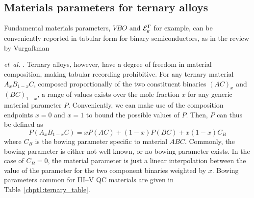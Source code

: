 \documentclass[12pt]{report}
\begin{document}
\subsection{Materials parameters for ternary alloys}

Fundamental materials parameters, $VBO$ and $\EE_g^\Gamma$ for example, can be conveniently reported in tabular form for binary semiconductors, as in the review by Vurgaftman {\emph{et~al.} \cite{Vurgaftman}.  Ternary alloys, however, have a degree of freedom in material composition, making tabular recording prohibitive.  For any ternary material $A_x B_{1-x} C$, composed proportionally of the two constituent binaries $(AC)_x$ and $(BC)_{1-x}$, a range of values exists over the mole fraction $x$ for any generic material parameter $P$.  Conveniently, we can make use of the composition endpoints $x=0$ and $x=1$ to bound the possible values of $P$.  Then, $P$ can thus be defined as
\begin{equation}
P(A_x B_{1-x} C) = x P(AC) + (1-x) P(BC) + x(1-x) C_B
\end{equation}
where $C_B$ is the bowing parameter specific to material $ABC$.  Commonly, the bowing parameter is either not well known, or no bowing parameter exists.  In the case of $C_B=0$, the material parameter is just a linear interpolation between the value of the parameter for the two component binaries weighted by $x$.  Bowing parameters common for III--V QC materials are given in Table~\ref{chpt1:ternary_table}.



}
\end{document}
